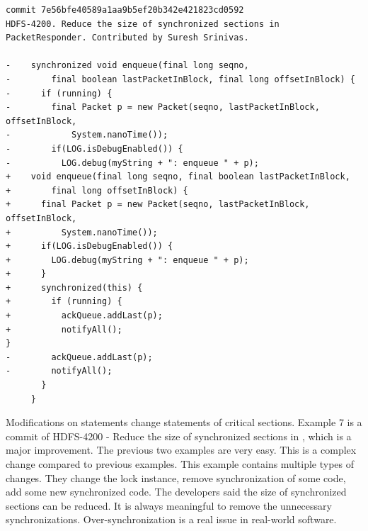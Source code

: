 

\begin{lstlisting}
commit 7e56bfe40589a1aa9b5ef20b342e421823cd0592
HDFS-4200. Reduce the size of synchronized sections in PacketResponder. Contributed by Suresh Srinivas.

-    synchronized void enqueue(final long seqno,
-        final boolean lastPacketInBlock, final long offsetInBlock) {
-      if (running) {
-        final Packet p = new Packet(seqno, lastPacketInBlock, offsetInBlock,
-            System.nanoTime());
-        if(LOG.isDebugEnabled()) {
-          LOG.debug(myString + ": enqueue " + p);
+    void enqueue(final long seqno, final boolean lastPacketInBlock,
+        final long offsetInBlock) {
+      final Packet p = new Packet(seqno, lastPacketInBlock, offsetInBlock,
+          System.nanoTime());
+      if(LOG.isDebugEnabled()) {
+        LOG.debug(myString + ": enqueue " + p);
+      }
+      synchronized(this) {
+        if (running) {
+          ackQueue.addLast(p);
+          notifyAll();
}
-        ackQueue.addLast(p);
-        notifyAll();
       }
     }
\end{lstlisting}

Modifications on statements change statements of critical sections. Example 7 is a commit of HDFS-4200 - Reduce the size of synchronized sections in , which is a major improvement. The previous two examples are very easy. This is a complex change compared to previous examples. This example contains multiple types of changes. They change the lock instance, remove synchronization of some code, add some new synchronized code. The developers said the size of synchronized sections can be reduced. It is always meaningful to remove the unnecessary synchronizations. Over-synchronization \cite{conf/sigsoft/GuJSZL15} is a real issue in real-world software.


